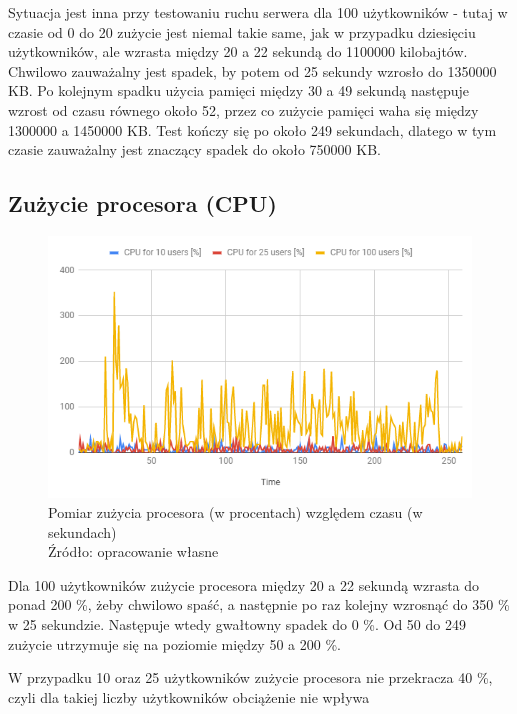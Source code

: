 Sytuacja jest inna przy testowaniu ruchu serwera dla 100 użytkowników - tutaj w czasie od 0 do 20 zużycie jest niemal takie same, jak w przypadku dziesięciu użytkowników, ale wzrasta między 20 a 22 sekundą do 1100000 kilobajtów. Chwilowo zauważalny jest spadek, by potem od 25 sekundy wzrosło do 1350000 KB. Po kolejnym spadku użycia pamięci między 30 a 49 sekundą następuje wzrost od czasu równego około 52, przez co zużycie pamięci waha się między 1300000 a 1450000 KB. Test kończy się po około 249 sekundach, dlatego w tym czasie zauważalny jest znaczący spadek do około 750000 KB. 

\subsection{Zużycie procesora (CPU)}

\begin{figure}[H]
\centering
\captionsetup{justification=centering}
\includegraphics[width=1\textwidth]{CPU.PNG}
\caption[Pomiar zużycia procesora (w procentach) względem czasu (w sekundach)]{\label{fig:ham}Pomiar zużycia procesora (w procentach) względem czasu (w sekundach) \\ Źródło: opracowanie własne}
\end{figure}

Dla 100 użytkowników zużycie procesora między 20 a 22 sekundą wzrasta do ponad 200 \%, żeby chwilowo spaść, a następnie po raz kolejny wzrosnąć do 350 \% w 25 sekundzie. Następuje wtedy gwałtowny spadek do 0 \%. Od 50 do 249 zużycie utrzymuje się na poziomie między 50 a 200 \%.

W przypadku 10 oraz 25 użytkowników zużycie procesora nie przekracza 40 \%, czyli dla takiej liczby użytkowników obciążenie nie wpływa 

